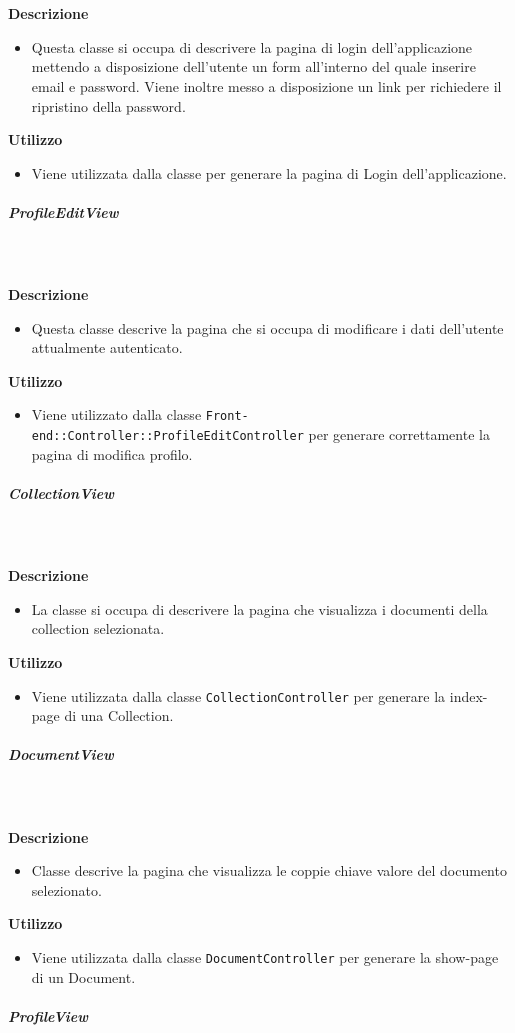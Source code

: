 				\textbf{\\ \\ Descrizione} 
					\begin{itemize}
						\item[] Questa classe si occupa di descrivere la pagina di login dell'applicazione mettendo a disposizione dell'utente un form all'interno del quale inserire email e password. Viene inoltre messo a disposizione un link per richiedere il ripristino della password.
					\end{itemize}      
				\textbf{Utilizzo}  
					\begin{itemize}
						\item[] Viene utilizzata dalla classe  per generare la pagina di Login dell'applicazione.
					\end{itemize}
			\subparagraph{ProfileEditView}
				
				\textbf{\\ \\ Descrizione} 
					\begin{itemize}
						\item[] Questa classe descrive la pagina che si occupa di modificare i dati dell'utente attualmente autenticato.
					\end{itemize}      
				\textbf{Utilizzo}  
					\begin{itemize}
						\item[] Viene utilizzato dalla classe \texttt{Front-end::Controller::ProfileEditController} per generare correttamente la pagina di modifica profilo.
					\end{itemize}
			\subparagraph{CollectionView}
				
				\textbf{\\ \\ Descrizione} 
					\begin{itemize}
						\item[] La classe si occupa di descrivere la pagina che visualizza i documenti della collection selezionata.
					\end{itemize}      
				\textbf{Utilizzo}  
					\begin{itemize}
						\item[] Viene utilizzata dalla classe \texttt{CollectionController} per generare la index-page di una Collection.
					\end{itemize}
			\subparagraph{DocumentView}
				
				\textbf{\\ \\ Descrizione} 
					\begin{itemize}
						\item[] Classe descrive la pagina che visualizza le coppie chiave valore del documento selezionato.
					\end{itemize}      
				\textbf{Utilizzo}  
					\begin{itemize}
						\item[] Viene utilizzata dalla classe \texttt{DocumentController} per generare la show-page di un Document.
					\end{itemize}
			\subparagraph{ProfileView}
				
